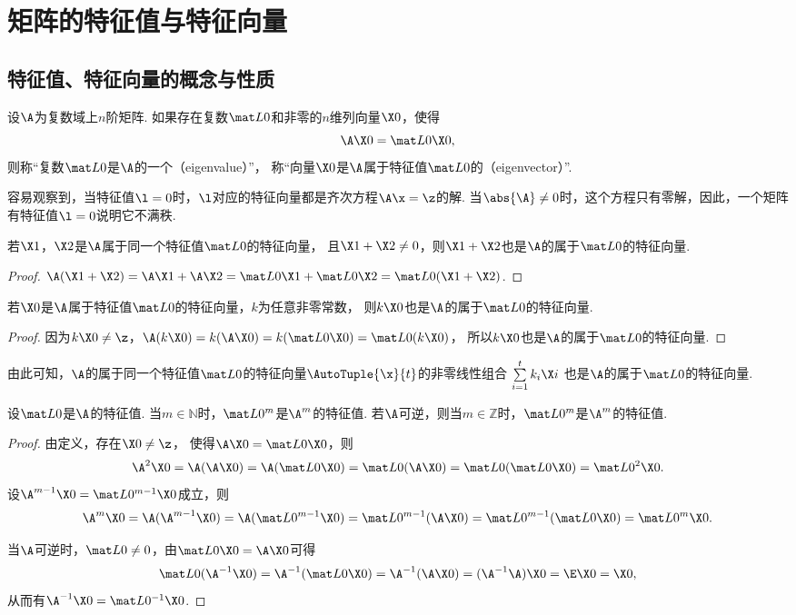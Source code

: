 \section{矩阵的特征值与特征向量}
\subsection{特征值、特征向量的概念与性质}
\begin{definition}
设\(\A\)为复数域上\(n\)阶矩阵.
如果存在复数\(\L0\)和非零的\(n\)维列向量\(\X0\)，使得\[
\A\X0 = \L0\X0,
\]
则称“复数\(\L0\)是\(\A\)的一个（eigenvalue）”，
称“向量\(\X0\)是\(\A\)属于特征值\(\L0\)的（eigenvector）”.
\end{definition}

容易观察到，当特征值\(\l=0\)时，\(\l\)对应的特征向量都是齐次方程\(\A\x=\z\)的解.
当\(\abs{\A}\neq0\)时，这个方程只有零解，因此，一个矩阵有特征值\(\l=0\)说明它不满秩.

\begin{property}
若\(\X1\)，\(\X2\)是\(\A\)属于同一个特征值\(\L0\)的特征向量，
且\(\X1 + \X2 \neq 0\)，则\(\X1 + \X2\)也是\(\A\)的属于\(\L0\)的特征向量.
\begin{proof}
\(\A(\X1+\X2)=\A\X1+\A\X2=\L0\X1+\L0\X2=\L0(\X1+\X2)\).
\end{proof}
\end{property}

\begin{property}
若\(\X0\)是\(\A\)属于特征值\(\L0\)的特征向量，\(k\)为任意非零常数，
则\(k\X0\)也是\(\A\)的属于\(\L0\)的特征向量.
\begin{proof}
因为\(k\X0\neq\z\)，\(\A(k\X0)=k(\A\X0)=k(\L0\X0)=\L0(k\X0)\)，
所以\(k\X0\)也是\(\A\)的属于\(\L0\)的特征向量.
\end{proof}
\end{property}

由此可知，\(\A\)的属于同一个特征值\(\L0\)的特征向量\(\AutoTuple{\x}{t}\)的非零线性组合
\(\sum\limits_{i=1}^t{k_i \X i}\)
也是\(\A\)的属于\(\L0\)的特征向量.

\begin{property}
设\(\L0\)是\(\A\)的特征值.
当\(m\in\mathbb{N}\)时，\(\L0^m\)是\(\A^m\)的特征值.
若\(\A\)可逆，则当\(m\in\mathbb{Z}\)时，\(\L0^m\)是\(\A^m\)的特征值.
\begin{proof}
由定义，存在\(\X0\neq\z\)，%
使得\(\A\X0 = \L0\X0\)，则\[
\A^2\X0 = \A(\A\X0)
=\A(\L0\X0)
=\L0(\A\X0)
=\L0(\L0\X0)
=\L0^2\X0.
\]
设\(\A^{m-1}\X0 = \L0^{m-1}\X0\)成立，则\[
\A^m\X0 = \A(\A^{m-1}\X0)
= \A(\L0^{m-1}\X0)
= \L0^{m-1}(\A\X0)
= \L0^{m-1}(\L0\X0)
= \L0^m\X0.
\]

当\(\A\)可逆时，\(\L0\neq0\)，由\(\L0\X0 = \A\X0\)可得\[
\L0(\A^{-1}\X0) = \A^{-1}(\L0\X0) = \A^{-1}(\A\X0) = (\A^{-1}\A)\X0 = \E\X0 = \X0,
\]从而有\(\A^{-1}\X0 = \L0^{-1}\X0\).
\end{proof}
\end{property}

